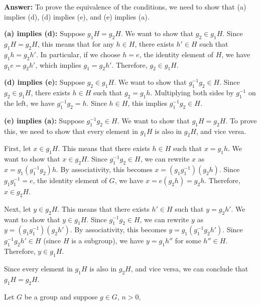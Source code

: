 \documentclass[12pt,reqno]{amsart}
\newcommand{\probskip}{\vskip1cm}
\begin{document}

\textbf{Answer:} To prove the equivalence of the conditions, we need to show that (a) implies (d), (d) implies (e), and (e) implies (a).

\textbf{(a) implies (d):} Suppose $g_1 H = g_2 H$. We want to show that $g_2 \in g_1 H$. Since $g_1 H = g_2 H$, this means that for any $h \in H$, there exists $h' \in H$ such that $g_1 h = g_2 h'$. In particular, if we choose $h = e$, the identity element of $H$, we have $g_1 e = g_2 h'$, which implies $g_1 = g_2 h'$. Therefore, $g_2 \in g_1 H$.

\textbf{(d) implies (e):} Suppose $g_2 \in g_1 H$. We want to show that $g_1^{-1} g_2 \in H$. Since $g_2 \in g_1 H$, there exists $h \in H$ such that $g_2 = g_1 h$. Multiplying both sides by $g_1^{-1}$ on the left, we have $g_1^{-1} g_2 = h$. Since $h \in H$, this implies $g_1^{-1} g_2 \in H$.

\textbf{(e) implies (a):} Suppose $g_1^{-1} g_2 \in H$. We want to show that $g_1 H = g_2 H$. To prove this, we need to show that every element in $g_1 H$ is also in $g_2 H$, and vice versa.

First, let $x \in g_1 H$. This means that there exists $h \in H$ such that $x = g_1 h$. We want to show that $x \in g_2 H$. Since $g_1^{-1} g_2 \in H$, we can rewrite $x$ as $x = g_1 (g_1^{-1} g_2) h$. By associativity, this becomes $x = (g_1 g_1^{-1}) (g_2 h)$. Since $g_1 g_1^{-1} = e$, the identity element of $G$, we have $x = e (g_2 h) = g_2 h$. Therefore, $x \in g_2 H$.

Next, let $y \in g_2 H$. This means that there exists $h' \in H$ such that $y = g_2 h'$. We want to show that $y \in g_1 H$. Since $g_1^{-1} g_2 \in H$, we can rewrite $y$ as $y = (g_1 g_1^{-1}) (g_2 h')$. By associativity, this becomes $y = g_1 (g_1^{-1} g_2 h')$. Since $g_1^{-1} g_2 h' \in H$ (since $H$ is a subgroup), we have $y = g_1 h''$ for some $h'' \in H$. Therefore, $y \in g_1 H$.

Since every element in $g_1 H$ is also in $g_2 H$, and vice versa, we can conclude that $g_1 H = g_2 H$.

\probskip

\item[{\bf 6.14}] Let $G$ be a group and suppose $g\in G$, $n> 0$,
\end{document}
